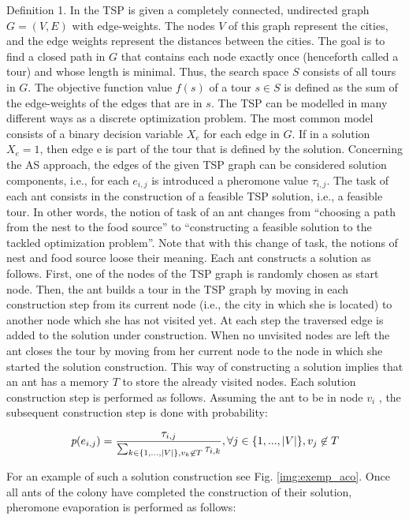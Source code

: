 Definition 1. In the TSP is given a completely connected, undirected
graph $G = (V , E)$ with edge-weights. The nodes $V$ of this graph
represent the cities, and the edge weights represent the distances
between the cities. The goal is to find a closed path in $G$ that
contains each node exactly once (henceforth called a tour) and whose
length is minimal. Thus, the search space $S$ consists of all tours in
$G$. The objective function value $f(s)$ of a tour $s \in S$ is defined as
the sum of the edge-weights of the edges that are in $s$. The TSP can
be modelled in many different ways as a discrete optimization problem.
The most common model consists of a binary decision variable $X_e$ for
each edge in $G$. If in a solution $X_e = 1$, then edge e is part of the
tour that is defined by the solution. Concerning the AS approach, the
edges of the given TSP graph can be considered solution components,
i.e., for each $e_{i,j}$ is introduced a pheromone value $\tau_{i,j}$. The task of
each ant consists in the construction of a feasible TSP solution, i.e.,
a feasible tour. In other words, the notion of task of an ant changes
from “choosing a path from the nest to the food source” to “constructing
a feasible solution to the tackled optimization problem”. Note that with
this change of task, the notions of nest and food source loose their
meaning. Each ant constructs a solution as follows. First, one of the
nodes of the TSP graph is randomly chosen as start node. Then, the ant
builds a tour in the TSP graph by moving in each construction step from
its current node (i.e., the city in which she is located) to another
node which she has not visited yet. At each step the traversed edge is
added to the solution under construction. When no unvisited nodes are
left the ant closes the tour by moving from her current node to the
node in which she started the solution construction. This way of
constructing a solution implies that an ant has a memory $T$ to store
the already visited nodes. Each solution construction step is performed
as follows. Assuming the ant to be in node $v_i$ , the subsequent
construction step is done with probability:

\begin{equation}
  \emph{p}(e_{i,j}) = \frac{\tau_{i,j}}{\sum_{k \in \lbrace 1,...,
  \vert V \vert\rbrace, v_k \not\in T}\tau_{i,k}},
  \forall j \in \lbrace 1,...,\vert V \vert\rbrace, v_j \not\in T
\end{equation}

For an example of such a solution construction see Fig. \ref{img:exemp_aco}.
Once all ants of the colony have completed the construction of their solution,
pheromone evaporation is performed as follows:

